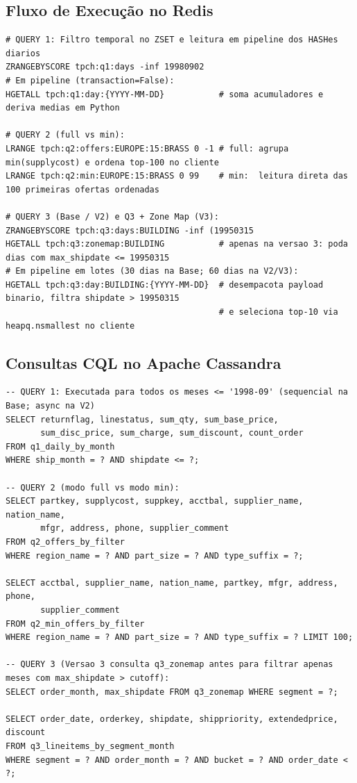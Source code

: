 \documentclass[12pt,a4paper]{article}
\begin{document}
\subsection{Fluxo de Execução no Redis}

\begin{lstlisting}[caption={Sequência de comandos Redis executados para Q1, Q2 (\texttt{full}/\texttt{min}), Q3 e Q3 Zone Map.}]
# QUERY 1: Filtro temporal no ZSET e leitura em pipeline dos HASHes diarios
ZRANGEBYSCORE tpch:q1:days -inf 19980902
# Em pipeline (transaction=False):
HGETALL tpch:q1:day:{YYYY-MM-DD}           # soma acumuladores e deriva medias em Python

# QUERY 2 (full vs min):
LRANGE tpch:q2:offers:EUROPE:15:BRASS 0 -1 # full: agrupa min(supplycost) e ordena top-100 no cliente
LRANGE tpch:q2:min:EUROPE:15:BRASS 0 99    # min:  leitura direta das 100 primeiras ofertas ordenadas

# QUERY 3 (Base / V2) e Q3 + Zone Map (V3):
ZRANGEBYSCORE tpch:q3:days:BUILDING -inf (19950315
HGETALL tpch:q3:zonemap:BUILDING           # apenas na versao 3: poda dias com max_shipdate <= 19950315
# Em pipeline em lotes (30 dias na Base; 60 dias na V2/V3):
HGETALL tpch:q3:day:BUILDING:{YYYY-MM-DD}  # desempacota payload binario, filtra shipdate > 19950315
                                           # e seleciona top-10 via heapq.nsmallest no cliente
\end{lstlisting}

\subsection{Consultas CQL no Apache Cassandra}

\begin{lstlisting}[caption={Consultas CQL preparadas executadas no Apache Cassandra para Q1, Q2, Q3 e Zone Map.}]
-- QUERY 1: Executada para todos os meses <= '1998-09' (sequencial na Base; async na V2)
SELECT returnflag, linestatus, sum_qty, sum_base_price,
       sum_disc_price, sum_charge, sum_discount, count_order
FROM q1_daily_by_month
WHERE ship_month = ? AND shipdate <= ?;

-- QUERY 2 (modo full vs modo min):
SELECT partkey, supplycost, suppkey, acctbal, supplier_name, nation_name,
       mfgr, address, phone, supplier_comment
FROM q2_offers_by_filter
WHERE region_name = ? AND part_size = ? AND type_suffix = ?;

SELECT acctbal, supplier_name, nation_name, partkey, mfgr, address, phone,
       supplier_comment
FROM q2_min_offers_by_filter
WHERE region_name = ? AND part_size = ? AND type_suffix = ? LIMIT 100;

-- QUERY 3 (Versao 3 consulta q3_zonemap antes para filtrar apenas meses com max_shipdate > cutoff):
SELECT order_month, max_shipdate FROM q3_zonemap WHERE segment = ?;

SELECT order_date, orderkey, shipdate, shippriority, extendedprice, discount
FROM q3_lineitems_by_segment_month
WHERE segment = ? AND order_month = ? AND bucket = ? AND order_date < ?;
\end{lstlisting}
\end{document}
